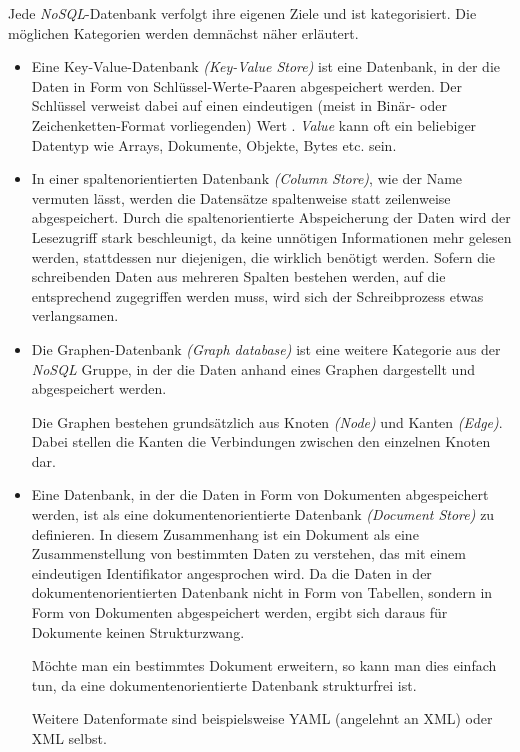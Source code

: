 Jede \textit{NoSQL}-Datenbank verfolgt ihre eigenen Ziele und ist kategorisiert. Die möglichen Kategorien werden demnächst näher erläutert.

\begin{itemize}
\item Eine Key-Value-Datenbank \textit{(Key-Value Store)} ist eine Datenbank, in der die Daten in Form von Schlüssel-Werte-Paaren abgespeichert werden. Der Schlüssel verweist dabei auf einen eindeutigen (meist in Binär- oder Zeichenketten-Format vorliegenden) Wert \cite{nosql}. \textit{Value} kann oft ein beliebiger Datentyp wie Arrays, Dokumente, Objekte, Bytes etc. sein.

\item In einer spaltenorientierten Datenbank \textit{(Column Store)}, wie der Name vermuten lässt, werden die Datensätze spaltenweise statt zeilenweise abgespeichert. Durch die spaltenorientierte Abspeicherung der Daten wird der Lesezugriff stark beschleunigt, da keine unnötigen Informationen mehr gelesen werden, stattdessen nur diejenigen, die wirklich benötigt werden.  Sofern die schreibenden Daten aus mehreren Spalten bestehen werden, auf die entsprechend zugegriffen werden muss, wird sich der Schreibprozess etwas verlangsamen.

\item Die Graphen-Datenbank \textit{(Graph database)} ist eine weitere Kategorie aus der \textit{NoSQL} Gruppe, in der die Daten anhand eines Graphen dargestellt und abgespeichert werden.

Die Graphen bestehen grundsätzlich aus Knoten \textit{(Node)} und Kanten \textit{(Edge)}. Dabei stellen die Kanten die Verbindungen zwischen den einzelnen Knoten dar.

\item Eine Datenbank, in der die Daten in Form von Dokumenten abgespeichert werden, ist als eine dokumentenorientierte Datenbank \textit{(Document Store)} zu definieren. In diesem Zusammenhang ist ein Dokument als eine Zusammenstellung von bestimmten Daten zu verstehen, das mit einem eindeutigen Identifikator angesprochen wird. Da die Daten in der dokumentenorientierten Datenbank nicht in Form von Tabellen, sondern in Form von Dokumenten abgespeichert werden, ergibt sich daraus für Dokumente keinen Strukturzwang.

Möchte man ein bestimmtes Dokument erweitern, so kann man dies einfach tun, da eine dokumentenorientierte Datenbank strukturfrei ist.

Weitere Datenformate sind beispielsweise YAML (angelehnt an XML) oder XML selbst. 
\end{itemize}

